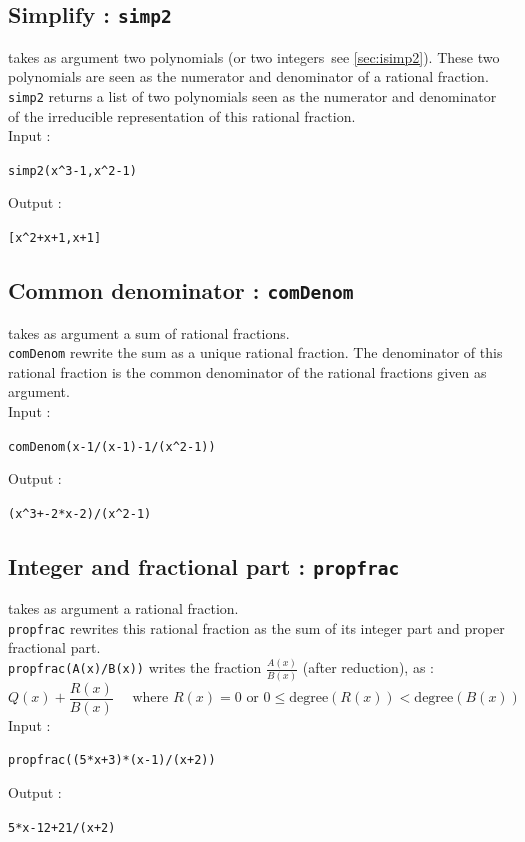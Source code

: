 \documentclass[a4paper,11pt]{book}
\begin{document}
\subsection{Simplify : {\tt simp2}}\label{sec:simp2}
 takes as argument two polynomials (or two integers\ see 
\ref{sec:isimp2}).
These two polynomials are seen as the numerator and denominator
of a rational fraction.\\ 
{\tt simp2} returns a list of two polynomials seen as the numerator
and denominator of the irreducible representation of
this rational fraction.\\ 
 Input :
\begin{center}{\tt simp2(x\verb|^|3-1,x\verb|^|2-1)}\end{center}
Output :
\begin{center}{\tt  [x\verb|^|2+x+1,x+1]}\end{center} 

\subsection{Common denominator : {\tt comDenom}}
 takes as argument a sum of rational fractions.\\
{\tt comDenom} rewrite the sum as a unique rational fraction.
The denominator of this rational fraction is the common denominator of the
rational fractions given as argument.\\
Input :
\begin{center}{\tt comDenom(x-1/(x-1)-1/(x\verb|^|2-1))}\end{center}
Output :
\begin{center}{\tt (x\verb|^|3+-2*x-2)/(x\verb|^|2-1)}\end{center} 

\subsection{Integer and fractional part : {\tt propfrac}}\label{sec:propfrac}
 takes as argument a rational fraction.\\
{\tt propfrac} rewrites this rational fraction as the sum of its
integer part and proper fractional part.\\
{\tt propfrac(A(x)/B(x))} writes the fraction $\frac{A(x)}{B(x)}$ (after 
reduction), as :
\[ Q(x)+\frac{R(x)}{B(x)} \quad  \mbox{ where } R(x)=0 
\mbox{ or } 0\leq \mbox{degree}(R(x))< \mbox{degree}(B(x)) \]
Input :
\begin{center}{\tt  propfrac((5*x+3)*(x-1)/(x+2))}\end{center}
Output :
\begin{center}{\tt 5*x-12+21/(x+2)}\end{center}
\end{document}
